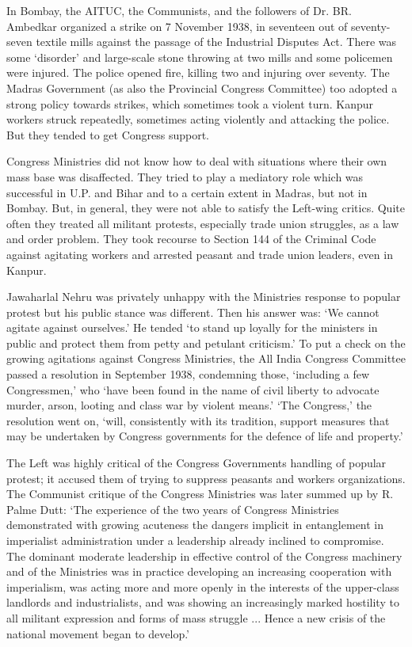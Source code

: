 \begin{multicols}{2}
In Bombay, the AITUC, the Communists, and the followers of Dr. BR. Ambedkar organized a strike on 7 November 1938, in seventeen out of seventy-seven textile mills against the passage of the Industrial Disputes Act. There was some `disorder' and large-scale stone throwing at two mills and some policemen were injured. The police opened fire, killing two and injuring over seventy. The Madras Government (as also the Provincial Congress Committee) too adopted a strong policy towards strikes, which sometimes took a violent turn. Kanpur workers struck repeatedly, sometimes acting violently and attacking the police. But they tended to get Congress support.

Congress Ministries did not know how to deal with situations where their own mass base was disaffected. They tried to play a mediatory role which was successful in U.P. and Bihar and to a certain extent in Madras, but not in Bombay. But, in general, they were not able to satisfy the Left-wing critics. Quite often they treated all militant protests, especially trade union struggles, as a law and order problem. They took recourse to Section 144 of the Criminal Code against agitating workers and arrested peasant and trade union leaders, even in Kanpur.

Jawaharlal Nehru was privately unhappy with the Ministries response to popular protest but his public stance was different. Then his answer was: `We cannot agitate against ourselves.' He tended `to stand up loyally for the ministers in public and protect them from petty and petulant criticism.' To put a check on the growing agitations against Congress Ministries, the All India Congress Committee passed a resolution in September 1938, condemning those, `including a few Congressmen,' who `have been found in the name of civil liberty to advocate murder, arson, looting and class war by violent means.' `The Congress,' the resolution went on, `will, consistently with its tradition, support measures that may be undertaken by Congress governments for the defence of life and property.'

The Left was highly critical of the Congress Governments handling of popular protest; it accused them of trying to suppress peasants and workers organizations. The Communist critique of the Congress Ministries was later summed up by R. Palme Dutt: `The experience of the two years of Congress Ministries demonstrated with growing acuteness the dangers implicit in entanglement in imperialist administration under a leadership already inclined to compromise. The dominant moderate leadership in effective control of the Congress machinery and of the Ministries was in practice developing an increasing cooperation with imperialism, was acting more and more openly in the interests of the upper-class landlords and industrialists, and was showing an increasingly marked hostility to all militant expression and forms of mass struggle ... Hence a new crisis of the national movement began to develop.'


\end{multicols}

